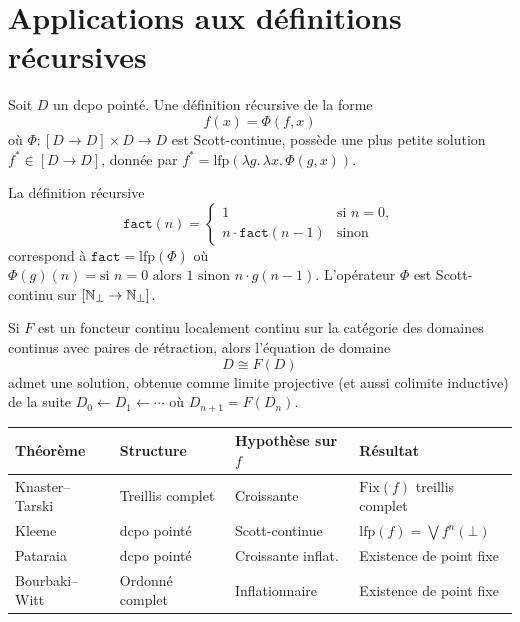 \section{Applications aux d\'efinitions r\'ecursives}

\begin{proposition}
Soit $D$ un dcpo point\'e. Une d\'efinition r\'ecursive de la forme
\[
  f(x) = \Phi(f, x)
\]
o\`u $\Phi\colon [D \to D] \times D \to D$ est Scott-continue, poss\`ede une plus petite
solution $f^* \in [D \to D]$, donn\'ee par $f^* = \mathrm{lfp}(\lambda g.\, \lambda x.\, \Phi(g,x))$.
\end{proposition}

\begin{exemple}[Factorielle]
La d\'efinition r\'ecursive
\[
  \mathtt{fact}(n) = \begin{cases} 1 & \text{si } n = 0, \\ n \cdot \mathtt{fact}(n-1) & \text{sinon} \end{cases}
\]
correspond \`a $\mathtt{fact} = \mathrm{lfp}(\Phi)$ o\`u $\Phi(g)(n) = \text{si } n = 0
\text{ alors } 1 \text{ sinon } n \cdot g(n-1)$. L'op\'erateur $\Phi$ est Scott-continu
sur $[\mathbb{N}_\bot \to \mathbb{N}_\bot]$.
\end{exemple}

\begin{theoreme}
Si $F$ est un foncteur continu localement continu sur la cat\'egorie des domaines continus
avec paires de r\'etraction, alors l'\'equation de domaine
\[
  D \cong F(D)
\]
admet une solution, obtenue comme limite projective (et aussi colimite inductive) de la
suite $D_0 \leftarrow D_1 \leftarrow \cdots$ o\`u $D_{n+1} = F(D_n)$.
\end{theoreme}

\begin{formules}[title=\textbf{R\'ecapitulatif des th\'eor\`emes de points fixes}]
\begin{center}
\renewcommand{\arraystretch}{1.3}
\begin{tabular}{|l|l|l|l|}
\hline
\textbf{Th\'eor\`eme} & \textbf{Structure} & \textbf{Hypoth\`ese sur $f$} & \textbf{R\'esultat} \\
\hline
Knaster--Tarski & Treillis complet & Croissante & $\mathrm{Fix}(f)$ treillis complet \\
Kleene & dcpo point\'e & Scott-continue & $\mathrm{lfp}(f) = \bigvee f^n(\bot)$ \\
Pataraia & dcpo point\'e & Croissante inflat. & Existence de point fixe \\
Bourbaki--Witt & Ordonn\'e complet & Inflationnaire & Existence de point fixe \\
\hline
\end{tabular}
\end{center}
\end{formules}

